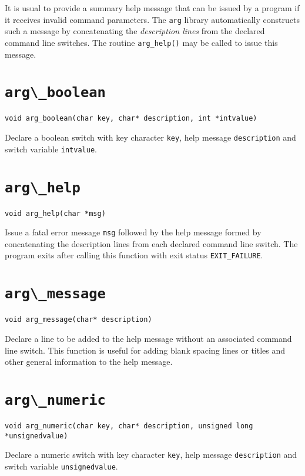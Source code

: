 It is usual to provide a summary help message that can be issued by a
program if it receives invalid command parameters. The {\tt arg} library
automatically constructs such a message by concatenating the {\em
description lines} from the declared command line switches. The routine
\verb+arg_help()+ may be called to issue this message.

\section{{\protect\verb+arg\_boolean+}}
\begin{verbatim}
void arg_boolean(char key, char* description, int *intvalue)
\end{verbatim}
Declare a boolean switch with key character {\tt key}, help message {\tt description} and
switch variable {\tt intvalue}.

\section{\protect\verb+arg\_help+}
\begin{verbatim}
void arg_help(char *msg)
\end{verbatim}
Issue a fatal error message {\tt msg} followed by the help message
formed by concatenating the description lines from each declared 
command line switch. The program exits after calling this function with exit status
\verb+EXIT_FAILURE+.

\section{\protect\verb+arg\_message+}
\begin{verbatim}
void arg_message(char* description)
\end{verbatim}
Declare a line to be added to the help message without an associated command line switch.
This function is useful for adding blank spacing lines or titles and other general information
to the help message.

\section{\protect\verb+arg\_numeric+}
\begin{verbatim}
void arg_numeric(char key, char* description, unsigned long *unsignedvalue)
\end{verbatim}
Declare a numeric switch with key character {\tt key}, help message {\tt description} and
switch variable {\tt unsignedvalue}.

